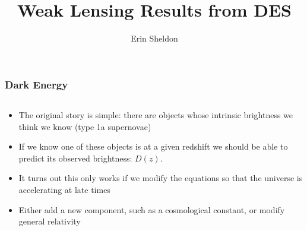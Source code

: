 \documentclass{beamer}
\title{Weak Lensing Results from DES}
\author{Erin Sheldon}
\institute{Brookhaven National Laboratory}
\begin{document}
\frame{\titlepage}


\frame
{
    \frametitle{Dark Energy}

    \fontsize{9}{0.8\baselineskip}
    \begin{columns}
        \begin{column}{0.5\textwidth}    
            \begin{itemize}

                \item The original story is simple: there are objects whose
                    intrinsic brightness we think we know (type 1a supernovae)

                \item If we know one of these objects is at a given redshift we
                    should be able to predict its observed brightness: $D(z)$.

                \item It turns out this only works if we modify the equations
                    so that the universe is accelerating at late times


                \item Either add a new component, such as a cosmological constant,
                    or modify general relativity


\end{itemize}
\end{column}
\end{columns}}
\end{document}
